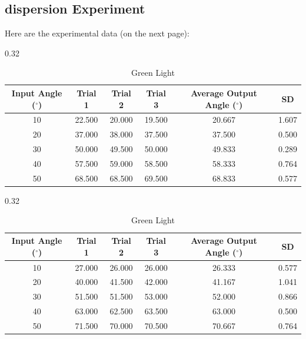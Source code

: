 \documentclass{article}
\begin{document}
\subsection{dispersion Experiment}
Here are the experimental data (on the next page):
\begin{table}[h!]
\begin{subtable}[t]{0.32\textwidth}
\centering
\begin{tabular}{c|| c c c| c c}
\hline
\textbf{Input Angle ($ ^\circ$)} & \textbf{Trial 1} & \textbf{Trial 2} & \textbf{Trial 3} & \textbf{Average Output Angle ($ ^\circ$)} & \textbf{SD}\\
\hline
10 & 22.500 & 20.000 & 19.500 & 20.667 & 1.607 \\
20 & 37.000 & 38.000 & 37.500 & 37.500 & 0.500 \\
30 & 50.000 & 49.500 & 50.000 & 49.833 & 0.289 \\
40 & 57.500 & 59.000 & 58.500 & 58.333 & 0.764 \\
50 & 68.500 & 68.500 & 69.500 & 68.833 & 0.577 \\
\hline
\end{tabular}
\caption{Red Light}
\end{subtable}

\hfill

\begin{subtable}[t]{0.32\textwidth}
\centering
\begin{tabular}{c|| c c c| c c}
\hline
\textbf{Input Angle ($ ^\circ$)} & \textbf{Trial 1} & \textbf{Trial 2} & \textbf{Trial 3} & \textbf{Average Output Angle ($ ^\circ$)} & \textbf{SD}\\
\hline
10 & 27.000 & 26.000 & 26.000 & 26.333 & 0.577 \\
20 & 40.000 & 41.500 & 42.000 & 41.167 & 1.041 \\
30 & 51.500 & 51.500 & 53.000 & 52.000 & 0.866 \\
40 & 63.000 & 62.500 & 63.500 & 63.000 & 0.500 \\
50 & 71.500 & 70.000 & 70.500 & 70.667 & 0.764 \\
\hline
\end{tabular}
\caption{Green Light}
\end{subtable}

\hfill


\end{table}
\end{document}
